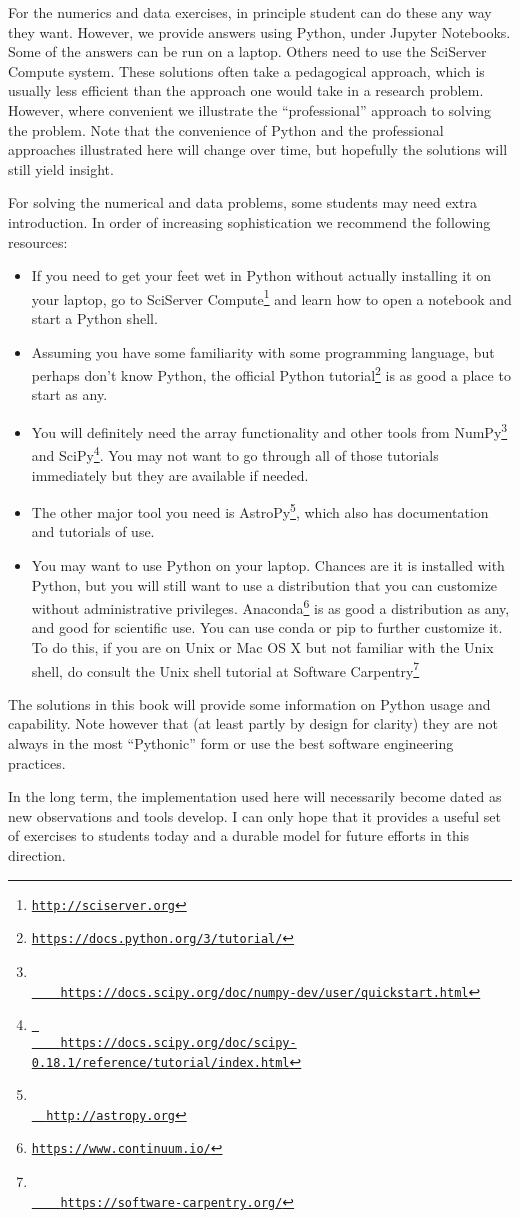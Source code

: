 \documentclass[11pt, preprint, maxnames=9]{aastex}
\begin{document}
For the numerics and data exercises, in principle student can do these
any way they want. However, we provide answers using Python, under
Jupyter Notebooks. Some of the answers can be run on a laptop. Others
need to use the SciServer Compute system.  These solutions often take
a pedagogical approach, which is usually less efficient than the
approach one would take in a research problem.  However, where
convenient we illustrate the ``professional'' approach to solving the
problem. Note that the convenience of Python and the professional
approaches illustrated here will change over time, but hopefully the
solutions will still yield insight.

For solving the numerical and data problems, some students may need
extra introduction. In order of increasing sophistication we recommend
the following resources:
\begin{itemize}
\item If you need to get your feet wet in Python without actually
  installing it on your laptop, go to SciServer
  Compute\footnote{\tt \url{http://sciserver.org}} and learn how to
  open a notebook and start a Python shell.
\item Assuming you have some familiarity with some programming
  language, but perhaps don't know Python, the official Python
  tutorial\footnote{\tt \url{https://docs.python.org/3/tutorial/}} is as
  good a place to start as any.
\item You will definitely need the array functionality and other tools
  from NumPy\footnote{\tt \url{
    https://docs.scipy.org/doc/numpy-dev/user/quickstart.html}} and
  SciPy\footnote{\tt \url{ 
    https://docs.scipy.org/doc/scipy-0.18.1/reference/tutorial/index.html}}. You
  may not want to go through all of those tutorials immediately but
  they are available if needed. 
\item The other major tool you need is AstroPy\footnote{\tt \url{
  http://astropy.org}}, which also has documentation and tutorials of
  use.
\item You may want to use Python on your laptop. Chances are it is
  installed with Python, but you will still want to use a distribution
  that you can customize without administrative
  privileges. Anaconda\footnote{\tt \url{https://www.continuum.io/}} is as
  good a distribution as any, and good for scientific use. You can use
  conda or pip to further customize it. To do this, if you are on Unix
  or Mac OS X but not familiar with the Unix shell, do consult the
  Unix shell tutorial at Software Carpentry\footnote{\tt \url{
    https://software-carpentry.org/}}
\end{itemize}
The solutions in this book will provide some information on Python
usage and capability. Note however that (at least partly by design for
clarity) they are not always in the most ``Pythonic'' form or use the
best software engineering practices.

In the long term, the implementation used here will necessarily become
dated as new observations and tools develop. I can only hope that it
provides a useful set of exercises to students today and a durable
model for future efforts in this direction.
\end{document}

